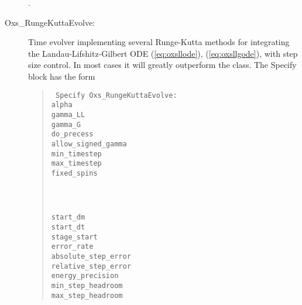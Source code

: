 \begin{description}
\begin{ExampleMifs}[Example]
  .
\end{ExampleMifs}

\item[Oxs\_RungeKuttaEvolve:\label{HTMLRungeKuttaEvolve}]
%
Time evolver implementing several Runge-Kutta methods for integrating
the Landau-Lifshitz-Gilbert ODE
(\ref{eq:oxsllode}), (\ref{eq:oxsllgode}), with step size control.  In
most cases it will greatly outperform the  class.
The Specify block has the form
   \begin{latexonly}
   \begin{quote}\tt
   Specify Oxs\_RungeKuttaEvolve: \ocb\\
    \bi alpha                  \oxsval{$\alpha$}\\
    \bi gamma\_LL              \oxsval{$\bar{\gamma}$}\\
    \bi gamma\_G               \oxsval{$\gamma$}\\
    \bi do\_precess            \\
    \bi allow\_signed\_gamma \\
    \bi min\_timestep          \\
    \bi max\_timestep          \\
    \bi fixed\_spins \ocb\\
    \bi\bi {}\\
    \bi\bi  {}\\
    \bi\ccb\\
    \bi start\_dm              \oxsval{$\Delta \vm$}\\
    \bi start\_dt              \\
    \bi stage\_start           \\
    \bi error\_rate            \\
    \bi absolute\_step\_error  \\
    \bi relative\_step\_error  \\
    \bi energy\_precision      \\
    \bi min\_step\_headroom    \\
    \bi max\_step\_headroom    \\

\end{quote}
\end{latexonly}
\end{description}
